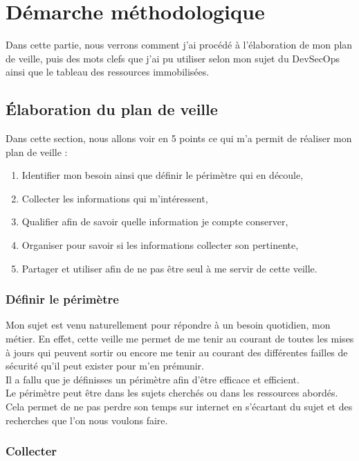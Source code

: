 \documentclass[11pt,a4paper,oneside]{book}
\begin{document}
\chapter{Démarche méthodologique}

Dans cette partie, nous verrons comment j'ai procédé à l'élaboration de mon plan de veille, puis des mots clefs que j'ai pu utiliser selon mon sujet du DevSecOps ainsi que le tableau des ressources immobilisées.

\section{Élaboration du plan de veille}

Dans cette section, nous allons voir en 5 points ce qui m'a permit de réaliser mon plan de veille :
\begin{enumerate}
\item Identifier mon besoin ainsi que définir le périmètre qui en découle,
\item Collecter les informations qui m'intéressent,
\item Qualifier afin de savoir quelle information je compte conserver,
\item Organiser pour savoir si les informations collecter son pertinente,
\item Partager et utiliser afin de ne pas être seul à me servir de cette veille.
\end{enumerate}


\subsection{Définir le périmètre}

Mon sujet est venu naturellement pour répondre à un besoin quotidien, mon métier.
En effet, cette veille me permet de me tenir au courant de toutes les mises à jours qui peuvent sortir ou encore me tenir au courant des différentes failles de sécurité qu'il peut exister pour m'en prémunir. \\
Il a fallu que je définisses un périmètre afin d'être efficace et efficient. \\
Le périmètre peut être dans les sujets cherchés ou dans les ressources abordés.
Cela permet de ne pas perdre son temps sur internet en s'écartant du sujet et des recherches que l'on nous voulons faire.

\subsection{Collecter}
\end{document}
